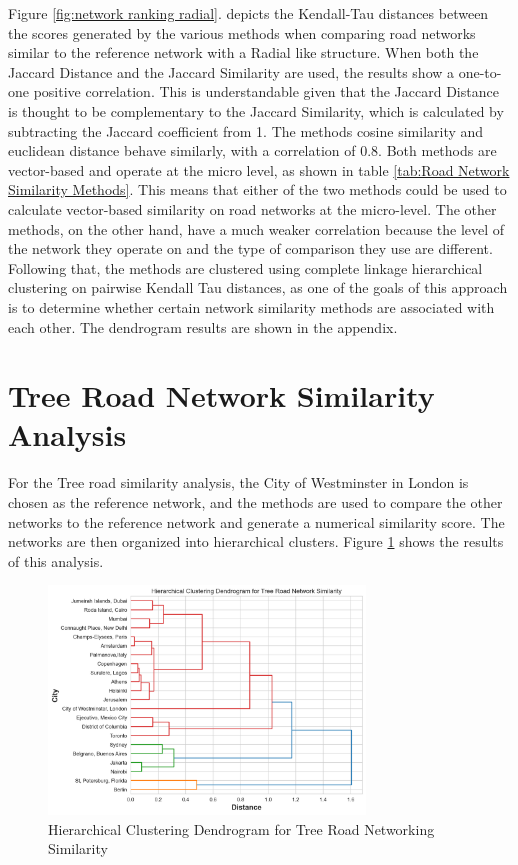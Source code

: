 Figure \ref{fig:network ranking radial}. depicts the Kendall-Tau distances between the scores generated by the various methods when comparing road networks similar to the reference network with a Radial like structure. When both the Jaccard Distance and the Jaccard Similarity are used, the results show a one-to-one positive correlation. This is understandable given that the Jaccard Distance is thought to be complementary to the Jaccard Similarity, which is calculated by subtracting the Jaccard coefficient from 1. The methods cosine similarity and euclidean distance behave similarly, with a correlation of 0.8. Both methods are vector-based and operate at the micro level, as shown in table \ref{tab:Road Network Similarity Methods}. This means that either of the two methods could be used to calculate vector-based similarity on road networks at the micro-level. The other methods, on the other hand, have a much weaker correlation because the level of the network they operate on and the type of comparison they use are different.
Following that, the methods are clustered using complete linkage hierarchical clustering on pairwise Kendall Tau distances, as one of the goals of this approach is to determine whether certain network similarity methods are associated with each other. The dendrogram results are shown in the appendix.

\section{Tree Road Network Similarity Analysis}

For the Tree road similarity analysis, the City of Westminster in London is chosen as the reference network, and the methods are used to compare the other networks to the reference network and generate a numerical similarity score. The networks are then organized into hierarchical clusters. Figure \ref{fig:Hierarchical Clustering Dendrogram for Tree Road Networking Similarity} shows the results of this analysis.

\begin{figure}[!ht]
\centering
\includegraphics[width=0.75\textwidth,center]{picture/Tree/tree_dendrogram2.png}
\caption[Hierarchical Clustering Dendrogram for Tree Road Networking Similarity]{Hierarchical Clustering Dendrogram for Tree Road Networking Similarity}
\label{fig:Hierarchical Clustering Dendrogram for Tree Road Networking Similarity}
\end{figure}

